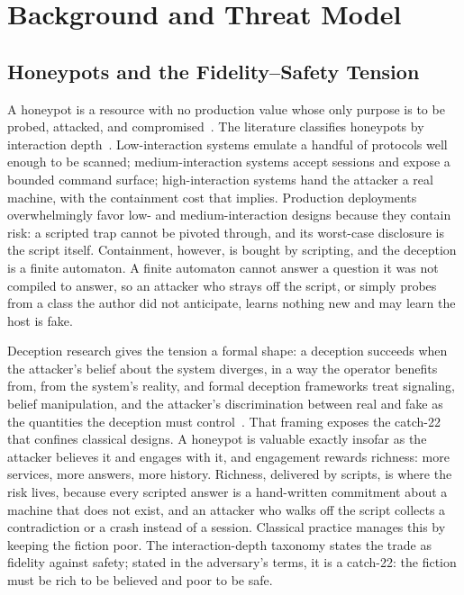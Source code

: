 \section{Background and Threat Model}
\label{sec:background}

\subsection{Honeypots and the Fidelity--Safety Tension}
\label{sec:tension}
A honeypot is a resource with no production value whose only purpose is to
be probed, attacked, and compromised~\cite{spitzner2002}. The literature
classifies honeypots by interaction depth~\cite{lopez2024}. Low-interaction
systems emulate a handful of protocols well enough to be scanned;
medium-interaction systems accept sessions and expose a bounded command
surface; high-interaction systems hand the attacker a real machine, with
the containment cost that implies. Production deployments overwhelmingly
favor low- and medium-interaction designs because they contain risk:
a scripted trap cannot be pivoted through, and its worst-case disclosure
is the script itself. Containment, however, is bought by scripting, and
the deception is a finite automaton. A finite automaton cannot answer a
question it was not compiled to answer, so an attacker who strays off the
script, or simply probes from a class the author did not anticipate,
learns nothing new and may learn the host is fake.

Deception research gives the tension a formal shape: a deception succeeds
when the attacker's belief about the system diverges, in a way the
operator benefits from, from the system's reality, and formal
deception frameworks treat signaling, belief manipulation, and the
attacker's discrimination between real and fake as the quantities the
deception must control~\cite{pawlick2021}. That framing exposes the
catch-22
that confines classical designs. A honeypot is valuable exactly insofar
as the attacker believes it and engages with it, and engagement rewards
richness: more services, more answers, more history. Richness, delivered
by scripts, is where the risk lives, because every scripted answer is a
hand-written commitment about a machine that does not exist, and an
attacker who walks off the script collects a contradiction or a crash
instead of a session. Classical practice manages this by keeping the
fiction poor. The interaction-depth taxonomy states the trade as
fidelity against safety; stated in the adversary's terms, it is a
catch-22: the fiction must be rich to be believed and poor to be safe.

